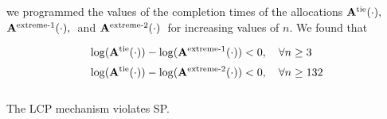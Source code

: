 \documentclass[letterpaper]{article} %
\theoremstyle{definition}
\newenvironment{customlemma}[1]
  {\renewcommand\theinnercustomlemma{#1}\innercustomlemma}
  {\endinnercustomlemma}
\newenvironment{customexample}[1]
  {\renewcommand\theinnercustomexample{#1}\innercustomexample}
  {\endinnercustomexample}
\begin{document}
\begin{customexample}{1}
\noindent we programmed the values of the completion times of the allocations $\mathbf{A}^{\textnormal{tie}}(\cdot), \;$ $\mathbf{A}^{\textnormal{extreme-1}}(\cdot),\;$ and $\mathbf{A}^{\textnormal{extreme-2}}(\cdot)\;$ for increasing values of $n$. We found that 
\begin{linenomath}
\begin{equation*}
\begin{split}
\log(\mathbf{A}^{\textnormal{tie}}(\cdot)) - \log(\mathbf{A}^{\textnormal{extreme-1}}(\cdot)) & < 0, \quad \forall n \geq 3 \\[2 pt]
\log(\mathbf{A}^{\textnormal{tie}}(\cdot)) - \log(\mathbf{A}^{\textnormal{extreme-2}}(\cdot)) & < 0, \quad \forall n \geq 132\\[8 pt]
\end{split}
\end{equation*}
\end{linenomath}

\end{customexample}


\begin{customlemma}{4}
The LCP mechanism violates SP.
\end{customlemma}
\end{document}
